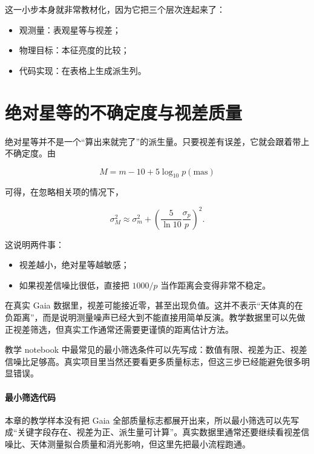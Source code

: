 这一小步本身就非常教材化，因为它把三个层次连起来了：

\begin{itemize}
    \item 观测量：表观星等与视差；
    \item 物理目标：本征亮度的比较；
    \item 代码实现：在表格上生成派生列。
\end{itemize}

\section{绝对星等的不确定度与视差质量}

绝对星等并不是一个“算出来就完了”的派生量。只要视差有误差，它就会跟着带上不确定度。由

\[
M = m - 10 + 5\log_{10} p(\mathrm{mas})
\]

可得，在忽略相关项的情况下，

\[
\sigma_M^2 \approx \sigma_m^2 + \left(\frac{5}{\ln 10}\frac{\sigma_p}{p}\right)^2.
\]

这说明两件事：

\begin{itemize}
    \item 视差越小，绝对星等越敏感；
    \item 如果视差信噪比很低，直接把 $1000/p$ 当作距离会变得非常不稳定。
\end{itemize}

\begin{warnbox}[负视差和低信噪比视差]
在真实 Gaia 数据里，视差可能接近零，甚至出现负值。这并不表示“天体真的在负距离”，而是说明测量噪声已经大到不能直接用简单反演。教学数据里可以先做正视差筛选，但真实工作通常还需要更谨慎的距离估计方法。
\end{warnbox}

\begin{protip}[最小质量筛选]
教学 notebook 中最常见的最小筛选条件可以先写成：数值有限、视差为正、视差信噪比足够高。真实项目里当然还要看更多质量标志，但这三步已经能避免很多明显错误。
\end{protip}

\paragraph{最小筛选代码}

本章的教学样本没有把 Gaia 全部质量标志都展开出来，所以最小筛选可以先写成“关键字段存在、视差为正、派生量可计算”。真实数据里通常还要继续看视差信噪比、天体测量拟合质量和消光影响，但这里先把最小流程跑通。

